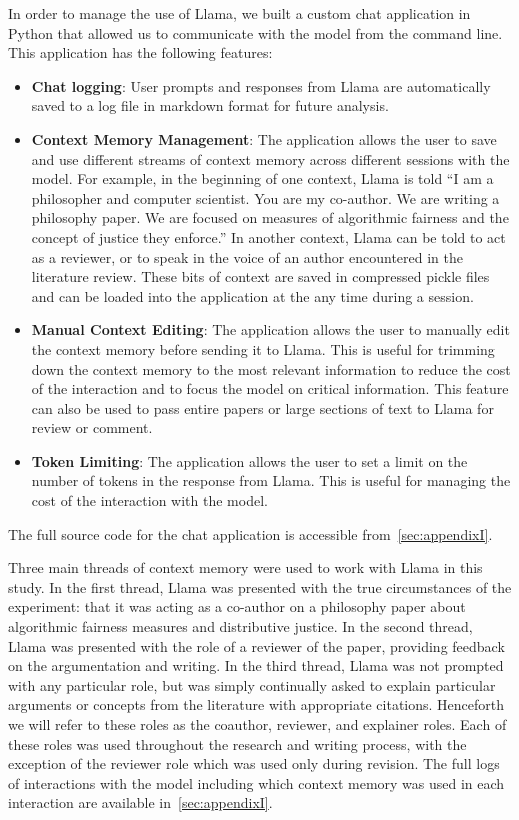 In order to manage the use of Llama, we built a custom chat application in
Python that allowed us to communicate with the model from the command line.
This application has the following features:
\begin{itemize}
    \item \textbf{Chat logging}: User prompts and responses from Llama are
    automatically saved to a log file in markdown format for future analysis.
    \item \textbf{Context Memory Management}: The application allows the user
    to save and use different streams of context memory across different
    sessions with the model. For example, in the beginning of one context, Llama
    is told ``I am a philosopher and computer scientist. You are my co-author.
    We are writing a philosophy paper. We are focused on measures of algorithmic
    fairness and the concept of justice they enforce.'' In another context,
    Llama can be told to act as a reviewer, or to speak in the voice of an
    author encountered in the literature review. These bits of context are saved
    in compressed pickle files and can be loaded into the application at the
    any time during a session.
    \item \textbf{Manual Context Editing}: The application allows the user to
    manually edit the context memory before sending it to Llama. This is useful
    for trimming down the context memory to the most relevant information to
    reduce the cost of the interaction and to focus the model on critical
    information. This feature can also be used to pass entire papers or large
    sections of text to Llama for review or comment.
    \item \textbf{Token Limiting}: The application allows the user to set a
    limit on the number of tokens in the response from Llama. This is useful for
    managing the cost of the interaction with the model.
\end{itemize}
The full source code for the chat application is accessible
from~\ref{sec:appendixI}.

Three main threads of context memory were used to work with Llama in this study.
In the first thread, Llama was presented with the true circumstances of the
experiment: that it was acting as a co-author on a philosophy paper about
algorithmic fairness measures and distributive justice. In the second thread,
Llama was presented with the role of a reviewer of the paper, providing feedback
on the argumentation and writing. In the third thread, Llama was not prompted
with any particular role, but was simply continually asked to explain particular
arguments or concepts from the literature with appropriate citations. Henceforth
we will refer to these roles as the coauthor, reviewer, and explainer roles. 
Each of these roles was used throughout the research and writing process, with
the exception of the reviewer role which was used only during revision. The full
logs of interactions with the model including which context memory was used in
each interaction are available in~\ref{sec:appendixI}.

